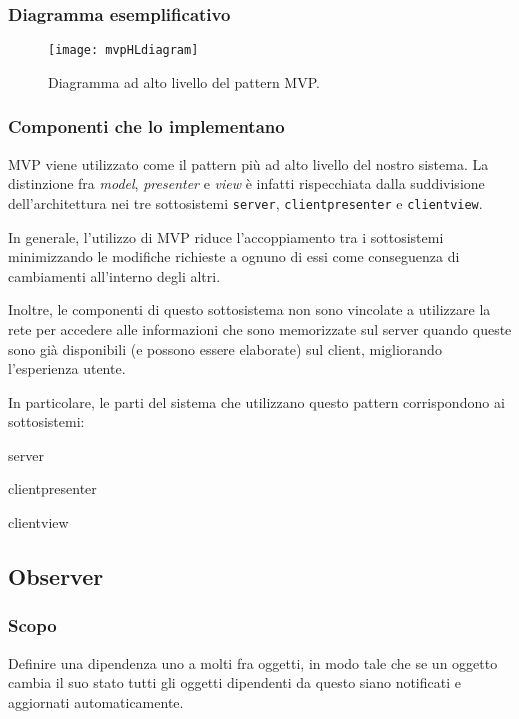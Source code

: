 \subsubsection{Diagramma esemplificativo}
\begin{figure}[h]
\centering
\texttt{[image: mvpHLdiagram]}
\caption{Diagramma ad alto livello del pattern MVP.}\label{fig:mvpHL}
\end{figure}

\subsubsection{Componenti che lo implementano}
MVP viene utilizzato come il pattern più ad alto livello del nostro sistema. La distinzione fra \textit{model}, \textit{presenter} e \textit{view} è infatti rispecchiata dalla suddivisione dell'architettura nei tre sottosistemi \texttt{server}, \texttt{clientpresenter} e \texttt{clientview}.

In generale, l'utilizzo di MVP riduce l'accoppiamento tra i sottosistemi minimizzando le modifiche richieste a ognuno di essi come conseguenza di cambiamenti all'interno degli altri.

Inoltre, le componenti di questo sottosistema non sono vincolate a utilizzare la rete per accedere alle informazioni che sono memorizzate sul server quando queste sono già disponibili (e possono essere elaborate) sul client, migliorando l'esperienza utente.

In particolare, le parti del sistema che utilizzano questo pattern corrispondono ai sottosistemi:
\begin{description}
  \item{\ttfamily server}
  \item{\ttfamily clientpresenter}
  \item{\ttfamily clientview} 
\end{description}

\subsection{Observer}
\subsubsection{Scopo}
Definire una dipendenza uno a molti fra oggetti, in modo tale che se un oggetto cambia il suo stato tutti gli oggetti dipendenti da questo siano notificati e aggiornati automaticamente.


